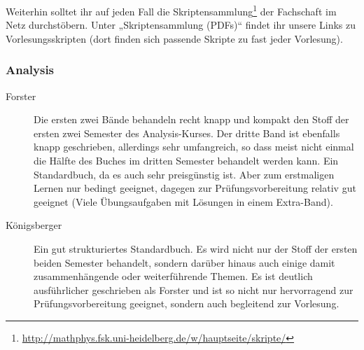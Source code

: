 Weiterhin solltet ihr auf jeden Fall die Skriptensammlung\footnote{\url{http://mathphys.fsk.uni-heidelberg.de/w/hauptseite/skripte/}} der Fachschaft im Netz durchstöbern. Unter „Skriptensammlung (PDFs)“ findet ihr unsere Links zu Vorlesungsskripten (dort finden sich passende Skripte zu fast jeder Vorlesung).

\subsubsection{Analysis}
\begin{description}

\item[Forster]{
		Die ersten zwei Bände behandeln recht knapp und kompakt den Stoff der ersten zwei Semester des Analysis-Kurses. Der dritte Band ist ebenfalls knapp geschrieben, allerdings sehr umfangreich, so dass meist nicht einmal die Hälfte des Buches im dritten Semester behandelt werden kann. Ein Standardbuch, da es auch sehr preisgünstig ist. Aber zum erstmaligen Lernen nur bedingt geeignet, dagegen zur Prüfungsvorbereitung relativ gut geeignet (Viele Übungsaufgaben mit Lösungen in einem Extra-Band).}


\item[Königsberger]{
		Ein gut strukturiertes Standardbuch. Es wird nicht nur der Stoff der ersten beiden Semester behandelt, sondern darüber hinaus auch einige damit zusammenhängende oder weiterführende Themen. Es ist deutlich ausführlicher geschrieben als Forster und ist so nicht nur hervorragend zur Prüfungsvorbereitung geeignet, sondern auch begleitend zur Vorlesung.}



\end{description}
